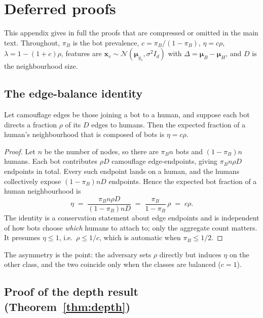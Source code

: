 \documentclass[../elsevier.tex]{subfiles}
\begin{document}
\appendix
\setcounter{section}{0}
\section{Deferred proofs}
\label{app:proofs}

This appendix gives in full the proofs that are compressed or omitted in the main
text. Throughout, $\pi_B$ is the bot prevalence, $c = \pi_B/(1-\pi_B)$,
$\eta = c\rho$, $\lambda = 1-(1+c)\rho$, features are $\mathbf{x}_v \sim
\mathcal{N}(\boldsymbol\mu_{y_v}, \sigma^2 I_d)$ with
$\Delta = \boldsymbol\mu_B - \boldsymbol\mu_H$, and $D$ is the neighbourhood size.

\subsection{The edge-balance identity}
\label{app:balance}

\begin{lemma}
Let camouflage edges be those joining a bot to a human, and suppose each bot directs
a fraction $\rho$ of its $D$ edges to humans. Then the expected fraction of a
human's neighbourhood that is composed of bots is $\eta = c\rho$.
\end{lemma}

\begin{proof}
Let $n$ be the number of nodes, so there are $\pi_B n$ bots and $(1-\pi_B)n$ humans.
Each bot contributes $\rho D$ camouflage edge-endpoints, giving
$\pi_B n \rho D$ endpoints in total. Every such endpoint lands on a human, and the
humans collectively expose $(1-\pi_B) n D$ endpoints. Hence the expected bot fraction
of a human neighbourhood is
\[
    \eta \;=\; \frac{\pi_B n \rho D}{(1-\pi_B) n D}
        \;=\; \frac{\pi_B}{1-\pi_B}\,\rho \;=\; c\rho .
\]
The identity is a conservation statement about edge endpoints and is independent of
how bots choose \emph{which} humans to attach to; only the aggregate count matters.
It presumes $\eta \leq 1$, i.e.\ $\rho \leq 1/c$, which is automatic when
$\pi_B \leq 1/2$.
\end{proof}

The asymmetry is the point: the adversary sets $\rho$ directly but induces $\eta$ on
the other class, and the two coincide only when the classes are balanced ($c=1$).

\subsection{Proof of the depth result (Theorem~\ref{thm:depth})}
\label{app:depth}
\end{document}
